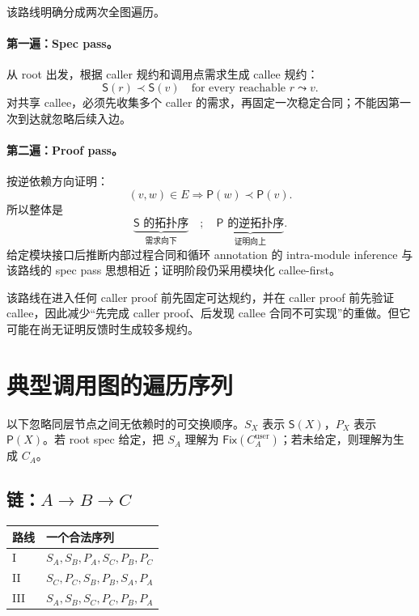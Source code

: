 \documentclass[UTF8,a4paper,11pt]{ctexart}
\newcommand{\SpecOp}{\mathsf{S}}
\newcommand{\ProofOp}{\mathsf{P}}
\newcommand{\Fix}{\mathsf{Fix}}
\begin{document}
该路线明确分成两次全图遍历。

\paragraph{第一遍：Spec pass。}
从 root 出发，根据 caller 规约和调用点需求生成 callee 规约：
\[
  \SpecOp(r)\prec \SpecOp(v)
  \quad\text{for every reachable }r\leadsto v.
\]
对共享 callee，必须先收集多个 caller 的需求，再固定一次稳定合同；不能因第一次到达就忽略后续入边。

\paragraph{第二遍：Proof pass。}
按逆依赖方向证明：
\[
  (v,w)\in E\Longrightarrow \ProofOp(w)\prec\ProofOp(v).
\]
所以整体是
\[
  \underbrace{\SpecOp\text{ 的拓扑序}}_{\text{需求向下}}
  \quad;\quad
  \underbrace{\ProofOp\text{ 的逆拓扑序}}_{\text{证明向上}}.
\]
给定模块接口后推断内部过程合同和循环 annotation 的 intra-module inference 与该路线的 spec pass 思想相近\cite{Lahiri2009IntraModule}；证明阶段仍采用模块化 callee-first。

该路线在进入任何 caller proof 前先固定可达规约，并在 caller proof 前先验证 callee，因此减少“先完成 caller proof、后发现 callee 合同不可实现”的重做。但它可能在尚无证明反馈时生成较多规约。

\section{典型调用图的遍历序列}

以下忽略同层节点之间无依赖时的可交换顺序。$S_X$ 表示 $\SpecOp(X)$，$P_X$ 表示 $\ProofOp(X)$。若 root spec 给定，把 $S_A$ 理解为 $\Fix(C_A^{\mathrm{user}})$；若未给定，则理解为生成 $C_A$。

\subsection{链：$A\to B\to C$}

\begin{center}
\begin{tabular}{ll}
\toprule
路线 & 一个合法序列\\
\midrule
I & $S_A,S_B,P_A,S_C,P_B,P_C$\\
II & $S_C,P_C,S_B,P_B,S_A,P_A$\\
III & $S_A,S_B,S_C,P_C,P_B,P_A$\\
\bottomrule
\end{tabular}
\end{center}
\end{document}
